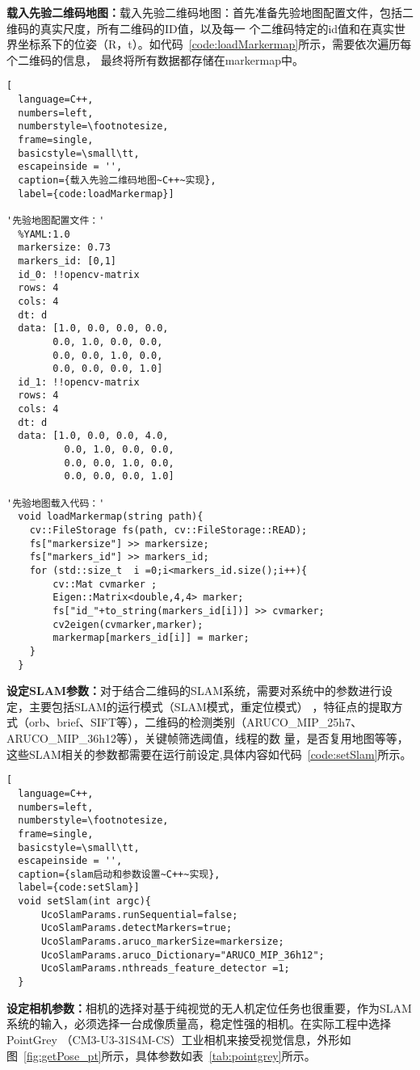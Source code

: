\textbf{载入先验二维码地图：}载入先验二维码地图：首先准备先验地图配置文件，包括二维码的真实尺度，所有二维码的ID值，以及每一
个二维码特定的id值和在真实世界坐标系下的位姿（R，t）。如代码~\ref{code:loadMarkermap}所示，需要依次遍历每个二维码的信息，
最终将所有数据都存储在markermap中。
\begin{lstlisting}[
  language=C++,
  numbers=left,                
  numberstyle=\footnotesize,
  frame=single,     
  basicstyle=\small\tt,    
  escapeinside = '',
  caption={载入先验二维码地图~C++~实现},
  label={code:loadMarkermap}]

'先验地图配置文件：'
  %YAML:1.0
  markersize: 0.73
  markers_id: [0,1]
  id_0: !!opencv-matrix
  rows: 4
  cols: 4
  dt: d
  data: [1.0, 0.0, 0.0, 0.0, 
        0.0, 1.0, 0.0, 0.0,  
        0.0, 0.0, 1.0, 0.0, 
        0.0, 0.0, 0.0, 1.0]
  id_1: !!opencv-matrix
  rows: 4
  cols: 4
  dt: d
  data: [1.0, 0.0, 0.0, 4.0, 
          0.0, 1.0, 0.0, 0.0,  
          0.0, 0.0, 1.0, 0.0, 
          0.0, 0.0, 0.0, 1.0]

'先验地图载入代码：'
  void loadMarkermap(string path){
    cv::FileStorage fs(path, cv::FileStorage::READ);
    fs["markersize"] >> markersize;
    fs["markers_id"] >> markers_id;
    for (std::size_t  i =0;i<markers_id.size();i++){
        cv::Mat cvmarker ;
        Eigen::Matrix<double,4,4> marker;
        fs["id_"+to_string(markers_id[i])] >> cvmarker;
        cv2eigen(cvmarker,marker);
        markermap[markers_id[i]] = marker;
    }
  }
\end{lstlisting}

\textbf{设定SLAM参数：}对于结合二维码的SLAM系统，需要对系统中的参数进行设定，主要包括SLAM的运行模式（SLAM模式，重定位模式）
，特征点的提取方式（orb、brief、SIFT等），二维码的检测类别（ARUCO\_MIP\_25h7、ARUCO\_MIP\_36h12等），关键帧筛选阈值，线程的数
量，是否复用地图等等，这些SLAM相关的参数都需要在运行前设定,具体内容如代码~\ref{code:setSlam}所示。

\begin{lstlisting}[
  language=C++,
  numbers=left,                
  numberstyle=\footnotesize,
  frame=single,     
  basicstyle=\small\tt,    
  escapeinside = '',
  caption={slam启动和参数设置~C++~实现},
  label={code:setSlam}]
  void setSlam(int argc){
      UcoSlamParams.runSequential=false;
      UcoSlamParams.detectMarkers=true;
      UcoSlamParams.aruco_markerSize=markersize;
      UcoSlamParams.aruco_Dictionary="ARUCO_MIP_36h12";
      UcoSlamParams.nthreads_feature_detector =1;
  }
\end{lstlisting}
\textbf{设定相机参数：}相机的选择对基于纯视觉的无人机定位任务也很重要，作为SLAM系统的输入，必须选择一台成像质量高，稳定性强的相机。在实际工程中选择PointGrey 
（CM3-U3-31S4M-CS）工业相机来接受视觉信息，外形如图~\ref{fig:getPose_pt}所示，具体参数如表~\ref{tab:pointgrey}所示。

